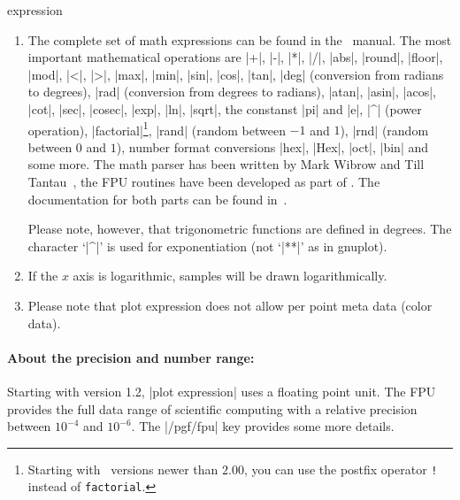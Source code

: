 \begin{addplotoperation}[]{expression }{}
\begin{enumerate}
	In short: it is the same whether you write |\x| or just |x| inside of math expressions.

	The variable name can be customized using |variable=\t| (the backslash is necessary!). Then, |t| will be the same as |\t|.
%

	\item The complete set of math expressions can be found in the \PGF\ manual. The most important mathematical operations are
	|+|, |-|, |*|, |/|, |abs|, |round|, |floor|, |mod|, |<|, |>|, |max|, |min|, |sin|, |cos|, |tan|, |deg| (conversion from radians to degrees), |rad| (conversion from degrees to radians), |atan|, |asin|, |acos|, |cot|, |sec|, |cosec|, |exp|, |ln|, |sqrt|, the constanst |pi| and |e|, |^| (power operation), |factorial|\footnote{Starting with \PGF\ versions newer than $2.00$, you can use the postfix operator \texttt{!} instead of \texttt{factorial}.}, |rand| (random between $-1$ and $1$), |rnd| (random between $0$ and $1$), number format conversions |hex|, |Hex|, |oct|, |bin| and some more. The math parser has been written by Mark Wibrow and Till Tantau~\cite{tikz}, the FPU routines have been developed as part of \PGFPlots. The documentation for both parts can be found in~\cite{tikz}.
	
	Please note, however, that trigonometric functions are defined in degrees. The character `|^|' is used for exponentiation (not `|**|' as in gnuplot).

	\item If the $x$ axis is logarithmic, samples will be drawn logarithmically.

	\item Please note that plot expression does not allow per point meta data (color data).
\end{enumerate}

\paragraph{About the precision and number range:}
%
%
	 Starting with version 1.2, |plot expression| uses a floating point unit. The FPU provides the full data range of scientific computing with a relative precision between $10^{-4}$ and $10^{-6}$. The |/pgf/fpu| key provides some more details. 


\end{addplotoperation}
